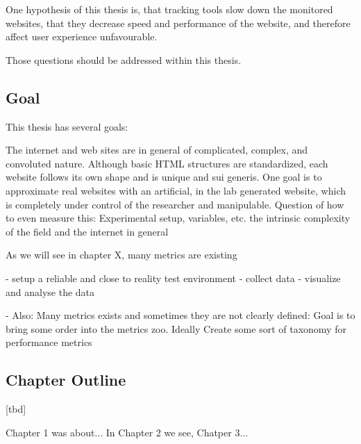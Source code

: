 One hypothesis of this thesis is, that tracking tools slow down the monitored websites, that they decrease speed and performance of the website, and therefore affect user experience unfavourable.

Those questions should be addressed within this thesis.


\subsection{Goal}

This thesis has several goals:

The internet and web sites are in general of complicated, complex, and convoluted nature.
Although basic HTML structures are standardized, each website follows its own shape and is unique and sui generis.
One goal is to approximate real websites with an artificial, in the lab generated website, which is completely under control of the researcher and manipulable.
Question of how to even measure this: Experimental setup, variables, etc.
the intrinsic complexity of the field and the internet in general


As we will see in chapter X, many metrics are existing

- setup a reliable and close to reality test environment
- collect data
- visualize and analyse the data

- Also: Many metrics exists and sometimes they are not clearly defined: Goal is to bring some order into the metrics zoo.
Ideally Create some sort of taxonomy for performance metrics










\subsection{Chapter Outline}

[tbd]


Chapter 1 was about...
In Chapter 2 we see,
Chatper 3...













